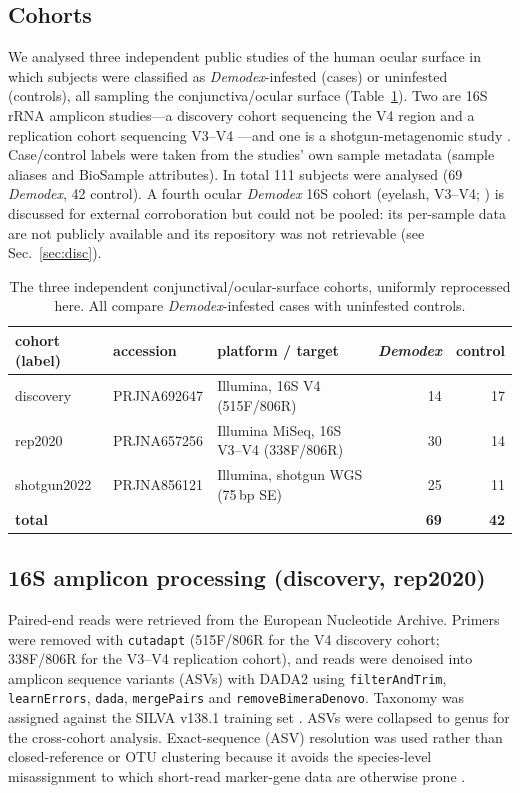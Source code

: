 \documentclass[11pt]{article}
\newcommand{\demodex}{\textit{Demodex}}
\begin{document}
\subsection{Cohorts}
We analysed three independent public studies of the human ocular surface in which
subjects were classified as \demodex{}-infested (cases) or uninfested (controls),
all sampling the conjunctiva/ocular surface (Table~\ref{tab:cohorts}). Two are 16S
rRNA amplicon studies---a discovery cohort sequencing the V4 region
\citep{liang2021} and a replication cohort sequencing V3--V4 \citep{yan2020}---and
one is a shotgun-metagenomic study \citep{fu2022}. Case/control labels were taken
from the studies' own sample metadata (sample aliases and BioSample attributes).
In total 111 subjects were analysed (69 \demodex{}, 42 control). A fourth ocular
\demodex{} 16S cohort (eyelash, V3--V4; \citealp{zou2024}) is discussed for
external corroboration but could not be pooled: its per-sample data are not
publicly available and its repository was not retrievable (see
Sec.~\ref{sec:disc}).

\begin{table}[t]
\centering
\small
\begin{tabular}{lllrr}
\toprule
cohort (label) & accession & platform / target & \demodex{} & control \\
\midrule
discovery \citep{liang2021}   & PRJNA692647 & Illumina, 16S V4 (515F/806R)      & 14 & 17 \\
rep2020 \citep{yan2020}       & PRJNA657256 & Illumina MiSeq, 16S V3--V4 (338F/806R) & 30 & 14 \\
shotgun2022 \citep{fu2022}    & PRJNA856121 & Illumina, shotgun WGS (75\,bp SE) & 25 & 11 \\
\midrule
\multicolumn{3}{l}{\textbf{total}} & \textbf{69} & \textbf{42} \\
\bottomrule
\end{tabular}
\caption{The three independent conjunctival/ocular-surface cohorts, uniformly
reprocessed here. All compare \demodex{}-infested cases with uninfested controls.}
\label{tab:cohorts}
\end{table}

\subsection{16S amplicon processing (discovery, rep2020)}
Paired-end reads were retrieved from the European Nucleotide Archive. Primers were
removed with \texttt{cutadapt} \citep{martin2011} (515F/806R for the V4 discovery
cohort; 338F/806R for the V3--V4 replication cohort), and reads were denoised into
amplicon sequence variants (ASVs) with DADA2 \citep{callahan2016} using
\texttt{filterAndTrim}, \texttt{learnErrors}, \texttt{dada}, \texttt{mergePairs}
and \texttt{removeBimeraDenovo}. Taxonomy was assigned against the SILVA v138.1
training set \citep{quast2013}. ASVs were collapsed to genus for the cross-cohort
analysis. Exact-sequence (ASV) resolution was used rather than closed-reference or
OTU clustering because it avoids the species-level misassignment to which
short-read marker-gene data are otherwise prone \citep{callahan2017}.
\end{document}
